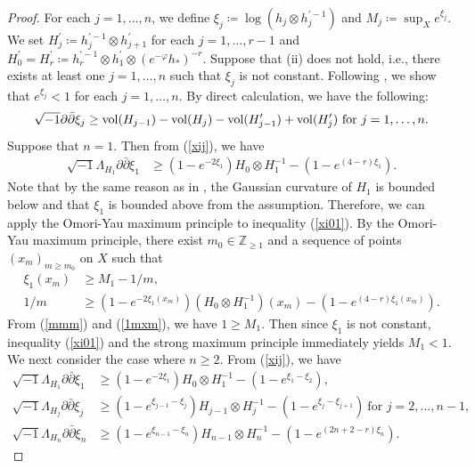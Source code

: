 \documentclass[12pt]{article}
\theoremstyle{definition}
\def\refe{\ast}
\def\vol{{\rm vol}}
\def\Z{{\mathbb Z}}
\def\inum{{\sqrt{-1}}}
\begin{document}
\begin{proof}
For each $j=1,\dots, n$, we define $\xi_j\coloneqq \log(h_j\otimes h_j^{\prime-1})$ and $M_j\coloneqq \sup_Xe^{\xi_j}$. We set $H_j^\prime\coloneqq h_j^{\prime-1}\otimes h_{j+1}^\prime$ for each $j=1,\dots, r-1$ and $H_0^\prime=H_r^\prime\coloneqq h_r^{\prime-1}\otimes h_1^\prime\otimes (e^{-\varphi}h_\refe)^{-r}$. Suppose that (ii) does not hold, i.e., there exists at least one $j = 1, \dots, n$ such that $\xi_j$ is not constant. Following \cite[Proof of Proposition 4.6]{LM1}, we show that $e^{\xi_j}<1$ for each $j=1,\dots, n$. By direct calculation, we have the following:
\begin{align}
\inum\partial \bar{\partial} \xi_j\geq \vol(H_{j-1})-\vol(H_j)-\vol(H_{j-1}^\prime)+\vol(H_j^\prime) \ \text{for $j=1,\dots, n$}. \label{xij}
\end{align}
Suppose that $n=1$. Then from (\ref{xij}), we have
\begin{align}
\inum \Lambda_{H_1}\partial \bar{\partial} \xi_1&\geq (1-e^{-2\xi_1})H_0\otimes H_1^{-1}-(1-e^{(4-r)\xi_1}). \label{xi01}
\end{align}
Note that by the same reason as in \cite[Lemma 2.4]{LM1}, the Gaussian curvature of $H_1$ is bounded below and that $\xi_1$ is bounded above from the assumption. Therefore, we can apply the Omori-Yau maximum principle to inequality (\ref{xi01}). By the Omori-Yau maximum principle, there exist $m_0\in\Z_{\geq 1}$ and a sequence of points $(x_m)_{m\geq m_0}$ on $X$ such that
\begin{align}
\xi_1(x_m)&\geq M_1-1/m, \label{mmm}\\
1/m&\geq (1-e^{-2\xi_1(x_m)})(H_0\otimes H_1^{-1})(x_m)-(1-e^{(4-r)\xi_1(x_m)}). \label{1mxm}
\end{align}
From (\ref{mmm}) and (\ref{1mxm}), we have $1\geq M_1$. Then since $\xi_1$ is not constant, inequality (\ref{xi01}) and the strong maximum principle immediately yields $M_1<1$. We next consider the case where $n\geq 2$. From (\ref{xij}), we have
\begin{align}
\inum\Lambda_{H_1}\partial \bar{\partial} \xi_1&\geq (1-e^{-2\xi_1})H_0\otimes H_1^{-1}-(1-e^{\xi_1-\xi_2}), \label{xi12}\\
\inum\Lambda_{H_j} \partial \bar{\partial} \xi_j &\geq (1-e^{\xi_{j-1}-\xi_j})H_{j-1}\otimes H_j^{-1}-(1-e^{\xi_j-\xi_{j+1}}) \ \text{for $j=2,\dots, n-1$}, \label{xi34}\\
\inum \Lambda_{H_n}\partial \bar{\partial} \xi_n&\geq (1-e^{\xi_{n-1}-\xi_n})H_{n-1}\otimes H_n^{-1}-(1-e^{(2n+2-r)\xi_n}). \label{xin}

\end{align}
\end{proof}
\end{document}
